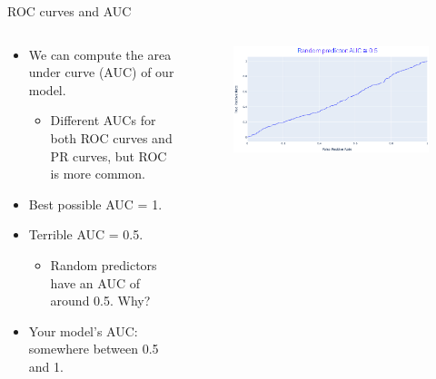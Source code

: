 \documentclass[aspectratio=169]{../latex_main/tntbeamer}  %
\begin{document}
	
	\begin{frame}{ROC curves and AUC}
	    \begin{columns}
	        \begin{column}{.5\textwidth}
	             \begin{itemize}
	                 \item We can compute the area under curve (AUC) of our model.
	                 \begin{itemize}
	                     \item Different AUCs for both ROC curves and PR curves, but ROC is more common.
	                 \end{itemize}
	                 \item Best possible AUC = 1.
	                 \item Terrible AUC = 0.5.
	                 \begin{itemize}
	                    \item Random predictors have an AUC of around 0.5. Why?
	                 \end{itemize}
	                 \item Your model’s AUC: somewhere between 0.5 and 1.
	             \end{itemize}
	        \end{column}
	        
	        
	        \begin{column}{.5\textwidth}
	                \begin{figure}
	                    \centering
	                    \includegraphics[scale=.35]{Bild30}
	                \end{figure}
	                
	                
	        \end{column}
	        
	    \end{columns}
	\end{frame}
	
\end{document}
